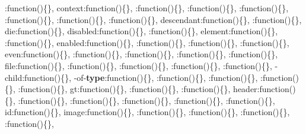 {\begin{DoxyParamCaption}
\textquotesingle{}\+:function()\{\}, \textquotesingle{}context\textquotesingle{}\+:function()\{\}, \textquotesingle{}\+:function()\{\}, \textquotesingle{}\+:function()\{\}, \textquotesingle{}\+:function()\{\}, \textquotesingle{}\+:function()\{\}, \textquotesingle{}\+:function()\{\}, \textquotesingle{}\+:function()\{\}, \textquotesingle{}descendant\textquotesingle{}\+:function()\{\}, \textquotesingle{}\+:function()\{\}, \textquotesingle{}die\textquotesingle{}\+:function()\{\}, \textquotesingle{}disabled\textquotesingle{}\+:function()\{\}, \textquotesingle{}\+:function()\{\}, \textquotesingle{}element\textquotesingle{}\+:function()\{\}, \textquotesingle{}\+:function()\{\}, \textquotesingle{}enabled\textquotesingle{}\+:function()\{\}, \textquotesingle{}\+:function()\{\}, \textquotesingle{}\+:function()\{\}, \textquotesingle{}\+:function()\{\}, \textquotesingle{}even\textquotesingle{}\+:function()\{\}, \textquotesingle{}\+:function()\{\}, \textquotesingle{}\+:function()\{\}, \textquotesingle{}\+:function()\{\}, \textquotesingle{}\+:function()\{\}, \textquotesingle{}file\textquotesingle{}\+:function()\{\}, \textquotesingle{}\+:function()\{\}, \textquotesingle{}\+:function()\{\}, \textquotesingle{}\+:function()\{\}, \textquotesingle{}\+:function()\{\}, -\/child\textquotesingle{}\+:function()\{\}, -\/of-\/{\bf type}\textquotesingle{}\+:function()\{\}, \textquotesingle{}\+:function()\{\}, \textquotesingle{}\+:function()\{\}, \textquotesingle{}\+:function()\{\}, \textquotesingle{}\+:function()\{\}, \textquotesingle{}gt\textquotesingle{}\+:function()\{\}, \textquotesingle{}\+:function()\{\}, \textquotesingle{}\+:function()\{\}, \textquotesingle{}header\textquotesingle{}\+:function()\{\}, \textquotesingle{}\+:function()\{\}, \textquotesingle{}\+:function()\{\}, \textquotesingle{}\+:function()\{\}, \textquotesingle{}\+:function()\{\}, \textquotesingle{}\+:function()\{\}, \textquotesingle{}id\textquotesingle{}\+:function()\{\}, \textquotesingle{}image\textquotesingle{}\+:function()\{\}, \textquotesingle{}\+:function()\{\}, \textquotesingle{}\+:function()\{\}, \textquotesingle{}\+:function()\{\}, \textquotesingle{}\+:function()\{\}, 
\end{DoxyParamCaption}}
